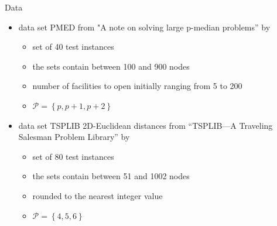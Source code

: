 \documentclass[utf8,aspectratio=169,ngerman,english]{beamer}
\renewcommand{\emph}[1]{\textcolor{jkuGreen}{#1}}
\begin{document}
\begin{frame}{Data}
    \vspace*{-2pt}
    \begin{itemize}
        \setlength\itemsep{1em}
        \item data set \emph{PMED} from "A note on solving large p-median problems” by \textcite{Beasley1985}
              \begin{itemize}
                  \item set of 40 test instances
                  \item the sets contain between 100 and 900 nodes
                  \item number of facilities to open initially ranging from 5 to 200
                  \item $\mathcal P = \left \{p, p+1, p+2\right \}$
              \end{itemize} \pause
        \item data set \emph{TSPLIB} 2D-Euclidean distances from “TSPLIB—A Traveling Salesman Problem Library” by \textcite{Reinelt1991}
              \begin{itemize}
                  \item set of 80 test instances
                  \item the sets contain between 51 and 1002 nodes
                  \item rounded to the nearest integer value
                  \item $\mathcal P = \left \{4, 5, 6\right \}$
              \end{itemize}
    \end{itemize}
\end{frame}
\end{document}
